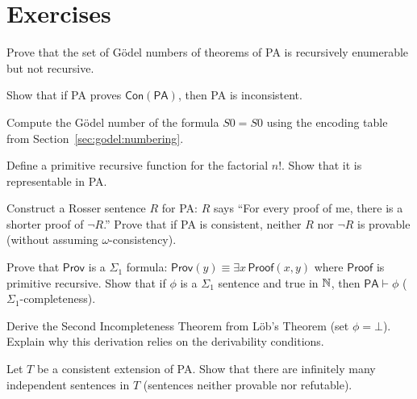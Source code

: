\section{Exercises}
\label{sec:godel:exercises}

\begin{exercise}[Basic]
Prove that the set of Gödel numbers of theorems of PA is recursively enumerable but not recursive.
\end{exercise}

\begin{exercise}[Basic]
Show that if PA proves $\mathsf{Con}(\mathsf{PA})$, then PA is inconsistent.
\end{exercise}

\begin{exercise}[Basic]
Compute the Gödel number of the formula $S0 = S0$ using the encoding table from Section~\ref{sec:godel:numbering}.
\end{exercise}

\begin{exercise}[Basic]
Define a primitive recursive function for the factorial $n!$. Show that it is representable in PA.
\end{exercise}

\begin{exercise}[Intermediate]
Construct a Rosser sentence $R$ for PA: $R$ says ``For every proof of me, there is a shorter proof of $\neg R$.'' Prove that if PA is consistent, neither $R$ nor $\neg R$ is provable (without assuming $\omega$-consistency).
\end{exercise}

\begin{exercise}[Intermediate]
Prove that $\mathsf{Prov}$ is a $\Sigma_1$ formula: $\mathsf{Prov}(y) \equiv \exists x\, \mathsf{Proof}(x, y)$ where $\mathsf{Proof}$ is primitive recursive. Show that if $\phi$ is a $\Sigma_1$ sentence and true in $\mathbb{N}$, then $\mathsf{PA} \vdash \phi$ ($\Sigma_1$-completeness).
\end{exercise}

\begin{exercise}[Intermediate]
Derive the Second Incompleteness Theorem from Löb's Theorem (set $\phi = \bot$). Explain why this derivation relies on the derivability conditions.
\end{exercise}

\begin{exercise}[Intermediate]
Let $T$ be a consistent extension of PA. Show that there are infinitely many independent sentences in $T$ (sentences neither provable nor refutable).
\end{exercise}

